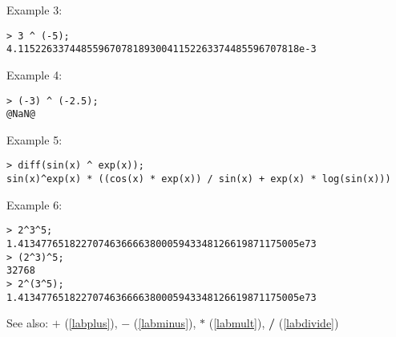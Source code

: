 \noindent Example 3: 
\begin{center}\begin{minipage}{15cm}\begin{Verbatim}[frame=single]
> 3 ^ (-5);
4.1152263374485596707818930041152263374485596707818e-3
\end{Verbatim}
\end{minipage}\end{center}
\noindent Example 4: 
\begin{center}\begin{minipage}{15cm}\begin{Verbatim}[frame=single]
> (-3) ^ (-2.5);
@NaN@
\end{Verbatim}
\end{minipage}\end{center}
\noindent Example 5: 
\begin{center}\begin{minipage}{15cm}\begin{Verbatim}[frame=single]
> diff(sin(x) ^ exp(x));
sin(x)^exp(x) * ((cos(x) * exp(x)) / sin(x) + exp(x) * log(sin(x)))
\end{Verbatim}
\end{minipage}\end{center}
\noindent Example 6: 
\begin{center}\begin{minipage}{15cm}\begin{Verbatim}[frame=single]
> 2^3^5;
1.4134776518227074636666380005943348126619871175005e73
> (2^3)^5;
32768
> 2^(3^5);
1.4134776518227074636666380005943348126619871175005e73
\end{Verbatim}
\end{minipage}\end{center}
See also: \textbf{$+$} (\ref{labplus}), \textbf{$-$} (\ref{labminus}), \textbf{$*$} (\ref{labmult}), \textbf{/} (\ref{labdivide})
